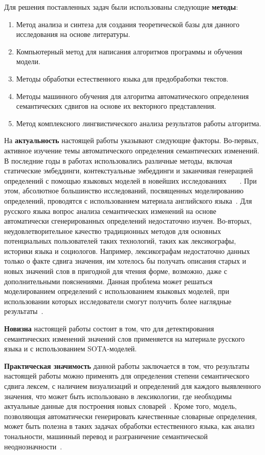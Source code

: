 \documentclass[LI,VKR]{HSEUniversity}
\begin{document}
Для решения поставленных задач были использованы следующие \textbf{методы}:
\begin{enumerate}
    \item  Метод анализа и синтеза для создания теоретической базы для данного исследования на основе
литературы.
    \item  Компьютерный метод для написания алгоритмов программы и обучения модели.
    \item  Методы обработки естественного языка для предобработки текстов.
    \item  Методы машинного обучения для алгоритма автоматического определения семантических сдвигов на
основе их векторного представления.
    \item  Метод комплексного лингвистического анализа результатов работы алгоритма.
\end{enumerate}

На \textbf{актуальность} настоящей работы указывают следующие факторы.
Во-первых, активное изучение темы автоматического определения семантических изменений.
В последние годы в работах использовались различные методы, включая статические эмбеддинги,
контекстуальные эмбеддинги и заканчивая генерацией определений с помощью языковых моделей
в новейших исследованиях
~~\cite{kutuzov-etal-2018-diachronic,rodina2020elmo,DefinitionGenerationMainArticle}~.
При этом, абсолютное большинство исследований, посвященных моделированию определений,
проводятся с использованием материала английского языка~\cite{DefinitionModelingReviewAndDatasetAnalysis}.
Для русского языка вопрос анализа семантических изменений на основе автоматически
сгенерированных определений недостаточно изучен.
Во-вторых, неудовлетворительное качество традиционных методов для основных потенциальных
пользователей таких технологий, таких как лексикографы, историки языка и социологов.
Например, лексикографам недостаточно данных только о факте сдвига значения, им хотелось бы
получать описания старых и новых значений слов в пригодной для чтения форме, возможно,
даже с дополнительными пояснениями.
Данная проблема может решаться моделированием определений с использованием языковых
моделей, при использовании которых исследователи смогут получить более наглядные
результаты~\cite{DefinitionGenerationMainArticle}.

\textbf{Новизна} настоящей работы состоит в том, что для детектирования семантических изменений
значений слов применяется на материале русского языка и с использованием SOTA-моделей.

\textbf{Практическая значимость} данной работы заключается в том, что результаты настоящей работы
можно применять для определения степени семантического сдвига лексем, с наличием визуализаций и
определений для каждого выявленного значения, что может быть использовано в лексикологии,
где необходимы актуальные данные для построения новых словарей~\cite{DefinitionGenerationMainArticle}.
Кроме того, модель, позволяющая автоматически генерировать качественные словарные определения,
может быть полезна в таких задачах обработки естественного языка, как анализ тональности,
машинный перевод и разграничение семантической неоднозначности~\cite{DefinitionModelingReviewAndDatasetAnalysis}.
\end{document}
